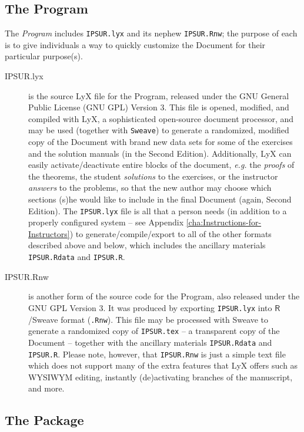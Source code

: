 \documentclass[captions=tableheading]{scrbook}
\begin{document}
\subsection*{The Program}

The \emph{Program} includes \texttt{IPSUR.lyx} and its nephew \texttt{IPSUR.Rnw}; the purpose of each is to give individuals a way to quickly customize the Document for their particular purpose(s).


\begin{description}
\item[IPSUR.lyx] is the source LyX file for the Program, released under the GNU General Public License (GNU GPL) Version 3. This file is opened, modified, and compiled with LyX, a sophisticated open-source document processor, and may be used (together with \texttt{Sweave}) to generate a randomized, modified copy of the Document with brand new data sets for some of the exercises and the solution manuals (in the Second Edition). Additionally, LyX can easily activate/deactivate entire blocks of the document, \emph{e.g.} the \emph{proofs} of the theorems, the student \emph{solutions} to the exercises, or the instructor \emph{answers} to the problems, so that the new author may choose which sections (s)he would like to include in the final Document (again, Second Edition). The \texttt{IPSUR.lyx} file is all that a person needs (in addition to a properly configured system -- see Appendix \ref{cha:Instructions-for-Instructors}) to generate/compile/export to all of the other formats described above and below, which includes the ancillary materials \texttt{IPSUR.Rdata} and \texttt{IPSUR.R}.
\item[IPSUR.Rnw] is another form of the source code for the Program, also released under the GNU GPL Version 3. It was produced by exporting \texttt{IPSUR.lyx} into \(\mathsf{R}\)/Sweave format (\texttt{.Rnw}). This file may be processed with Sweave to generate a randomized copy of \texttt{IPSUR.tex} -- a transparent copy of the Document -- together with the ancillary materials \texttt{IPSUR.Rdata} and \texttt{IPSUR.R}. Please note, however, that \texttt{IPSUR.Rnw} is just a simple text file which does not support many of the extra features that LyX offers such as WYSIWYM editing, instantly (de)activating branches of the manuscript, and more.
\end{description}



\subsection*{The Package}
\end{document}
